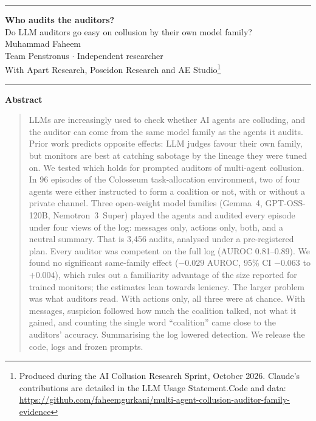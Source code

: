 \documentclass[11pt,letterpaper]{article}
\begin{document}
\noindent\rule{\textwidth}{2pt}
\begin{center}
{\LARGE\bfseries Who audits the auditors?}\\[5pt]
{\large Do LLM auditors go easy on collusion by their own model family?}\\[10pt]
Muhammad Faheem\\
Team Penstronus $\cdot$ Independent researcher\\[4pt]
With Apart Research, Poseidon Research and AE Studio\footnote{Produced during the AI Collusion Research Sprint, October 2026. Claude's contributions are detailed in the LLM Usage Statement.\newline Code and data: \url{https://github.com/faheemgurkani/multi-agent-collusion-auditor-family-evidence}}
\end{center}
\noindent\rule{\textwidth}{0.6pt}

\begin{center}\textbf{Abstract}\end{center}
\vspace{-4pt}
\begin{quote}
LLMs are increasingly used to check whether AI agents are colluding, and the auditor can come from the same model family as the agents it audits. Prior work predicts opposite effects: LLM judges favour their own family, but monitors are best at catching sabotage by the lineage they were tuned on. We tested which holds for prompted auditors of multi-agent collusion. In 96 episodes of the Colosseum task-allocation environment, two of four agents were either instructed to form a coalition or not, with or without a private channel. Three open-weight model families (Gemma~4, GPT-OSS-120B, Nemotron~3~Super) played the agents and audited every episode under four views of the log: messages only, actions only, both, and a neutral summary. That is 3,456 audits, analysed under a pre-registered plan. Every auditor was competent on the full log (AUROC 0.81--0.89). We found no significant same-family effect ($-0.029$ AUROC, 95\% CI $-0.063$ to $+0.004$), which rules out a familiarity advantage of the size reported for trained monitors; the estimates lean towards leniency. The larger problem was what auditors read. With actions only, all three were at chance. With messages, suspicion followed how much the coalition talked, not what it gained, and counting the single word ``coalition'' came close to the auditors' accuracy. Summarising the log lowered detection. We release the code, logs and frozen prompts.
\end{quote}
\end{document}

